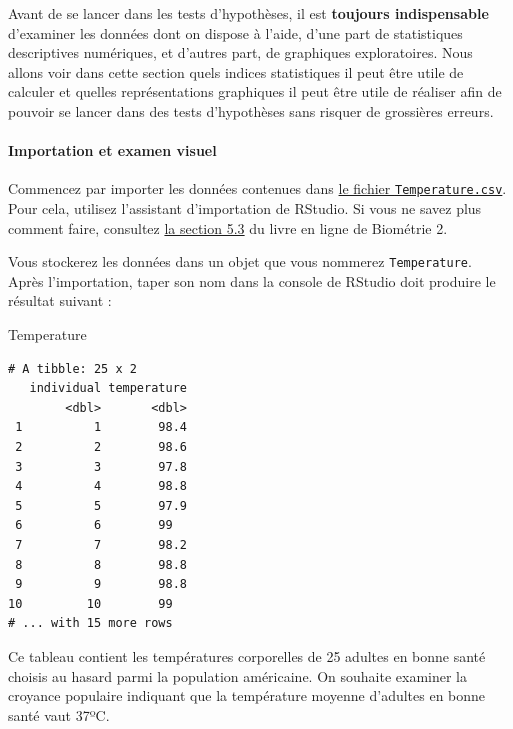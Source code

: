 \documentclass[a4paperpaper,]{article}
\newenvironment{Shaded}{\begin{snugshade}}{\end{snugshade}}
\newcommand{\NormalTok}[1]{\textcolor[rgb]{0.12,0.11,0.11}{#1}}
\let\oldparagraph\paragraph
\renewcommand{\paragraph}[1]{\oldparagraph{#1}\mbox{}}
\begin{document}
Avant de se lancer dans les tests d'hypothèses, il est \textbf{toujours indispensable} d'examiner les données dont on dispose à l'aide, d'une part de statistiques descriptives numériques, et d'autres part, de graphiques exploratoires. Nous allons voir dans cette section quels indices statistiques il peut être utile de calculer et quelles représentations graphiques il peut être utile de réaliser afin de pouvoir se lancer dans des tests d'hypothèses sans risquer de grossières erreurs.

\hypertarget{importation-et-examen-visuel}{%
\paragraph{Importation et examen visuel}\label{importation-et-examen-visuel}}

Commencez par importer les données contenues dans \href{https://besibo.github.io/Biometrie3/data/Temperature.csv}{le fichier \texttt{Temperature.csv}}. Pour cela, utilisez l'assistant d'importation de RStudio. Si vous ne savez plus comment faire, consultez \href{https://besibo.github.io/Biometrie2/tidyr.html\#importer-des-donnees-depuis-un-tableur}{la section 5.3} du livre en ligne de Biométrie 2.

Vous stockerez les données dans un objet que vous nommerez \texttt{Temperature}. Après l'importation, taper son nom dans la console de RStudio doit produire le résultat suivant :

\begin{Shaded}
\begin{Highlighting}[]
\NormalTok{Temperature}
\end{Highlighting}
\end{Shaded}

\begin{verbatim}
# A tibble: 25 x 2
   individual temperature
        <dbl>       <dbl>
 1          1        98.4
 2          2        98.6
 3          3        97.8
 4          4        98.8
 5          5        97.9
 6          6        99  
 7          7        98.2
 8          8        98.8
 9          9        98.8
10         10        99  
# ... with 15 more rows
\end{verbatim}

Ce tableau contient les températures corporelles de 25 adultes en bonne santé choisis au hasard parmi la population américaine. On souhaite examiner la croyance populaire indiquant que la température moyenne d'adultes en bonne santé vaut 37ºC.
\end{document}
